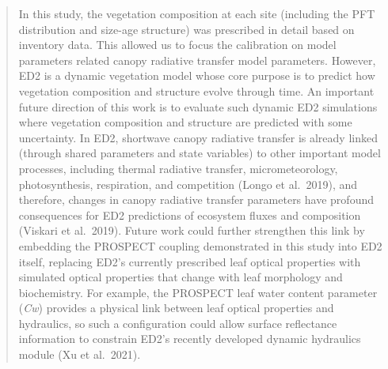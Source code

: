 \documentclass{article}
\begin{document}
\begin{quote}
  In this study, the vegetation composition at each site (including the PFT distribution and size-age structure) was prescribed in detail based on inventory data.
  This allowed us to focus the calibration on model parameters related canopy radiative transfer model parameters.
  However, ED2 is a dynamic vegetation model whose core purpose is to predict how vegetation composition and structure evolve through time.
  An important future direction of this work is to evaluate such dynamic ED2 simulations where vegetation composition and structure are predicted with some uncertainty.
  In ED2, shortwave canopy radiative transfer is already linked (through shared parameters and state variables) to other important model processes, including thermal radiative transfer, micrometeorology, photosynthesis, respiration, and competition (Longo et al.\ 2019),
  and therefore, changes in canopy radiative transfer parameters have profound consequences for ED2 predictions of ecosystem fluxes and composition (Viskari et al.\ 2019).
  Future work could further strengthen this link by embedding the PROSPECT coupling demonstrated in this study into ED2 itself, replacing ED2's currently prescribed leaf optical properties with simulated optical properties that change with leaf morphology and biochemistry.
  For example, the PROSPECT leaf water content parameter (\emph{Cw}) provides a physical link between leaf optical properties and hydraulics, so such a configuration could allow surface reflectance information to constrain ED2's recently developed dynamic hydraulics module (Xu et al.\ 2021).
\end{quote}
\end{document}
